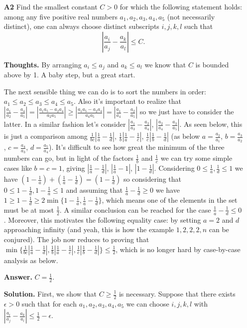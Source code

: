 \documentclass[11pt,a4paper]{article}
\begin{document}
\begin{itemize}
\item[\textbf{A2}]
 Find the smallest constant $C > 0$ for which the following statement holds: among any five positive real numbers $a_1,a_2,a_3,a_4,a_5$ (not necessarily distinct), one can always choose distinct subscripts $i,j,k,l$ such that
\[ \left| \frac{a_i}{a_j} - \frac {a_k}{a_l} \right| \le C. \]

\textbf{Thoughts.} 
By arranging $a_i\le a_j$ and $a_k\le a_l$ we know that $C$ is bounded above by 1. A baby step, but a great start.

The next sensible thing we can do is to sort the numbers in order: 
$a_1\le a_2\le a_3\le a_4\le a_5$. 
Also it's important to realize that $|\frac{a_1}{a_2}-\frac{a_4}{a_5}|=|\frac{a_1a_5-a_2a_4}{a_2a_5}|\ge |\frac{a_1a_5-a_2a_4}{a_4a_5}|=|\frac{a_1}{a_4}-\frac{a_2}{a_5}|$ so we just have to consider the latter. 
In a similar fashion let's consider $|\frac{a_1}{a_3}-\frac{a_2}{a_4}|$, 
$|\frac{a_2}{a_4}-\frac{a_3}{a_5}|$. 
As seen below, this is just a comparison among 
$\frac 1{bc}|\frac 1a-\frac 1d|$, $\frac 1b|\frac 1a-\frac 1c|$, $\frac 1c|\frac 1b-\frac 1d|$ 
(as below  $a=\frac {a_2}{a_1}$, 
$b=\frac {a_3}{a_2}$, 
$c=\frac {a_4}{a_3}$, 
$d=\frac {a_5}{a_4}$). 
It's difficult to see how great the minimum of the three numbers can go, 
but in light of the factors $\frac 1b$ and $\frac 1c$ we can try some simple cases like $b=c=1$, 
giving $|\frac 1a-\frac 1d|$, $|\frac 1a-1|$, $|1-\frac 1d|$. 
Considering $0\le \frac 1a, \frac 1d\le 1$ we have 
$(1-\frac 1a)+(\frac 1a-\frac 1d)=(1-\frac 1d)$ 
so considering that $0\le 1-\frac 1d, 1-\frac 1a\le 1$ and assuming that $\frac 1a-\frac 1d\ge 0$ we have 
$1\ge 1-\frac 1d\ge 2\min\{1-\frac 1a, \frac 1a-\frac 1d\}$, which means one of the elements in the set must be at most $\frac 12$. 
A similar conclusion can be reached for the case $\frac 1a-\frac 1d\le 0$. 
Moreover, this motivates the following equality case: by setting $a=2$ and $d$ approaching infinity (and yeah, this is how the example $1, 2, 2, 2, n$ can be conjured). 
The job now reduces to proving that $\min \{\frac 1{bc}|\frac 1a-\frac 1d|, \frac 1b|\frac 1a-\frac 1c|, \frac 1c|\frac 1b-\frac 1d|\}\le \frac 12$, which is no longer hard by case-by-case analysis as below. 

\textbf{Answer.} $C=\frac 12$. 

\textbf{Solution.} 
First, we show that $C\ge\frac 12$ is necessary. 
Suppose that there exists $\epsilon >0$ such that for each $a_1,a_2,a_3,a_4,a_5$ we can choose $i, j, k, l$ with 
$\left| \frac{a_i}{a_j} - \frac {a_k}{a_l} \right| \le \frac 12-\epsilon $. 


\end{itemize}
\end{document}
